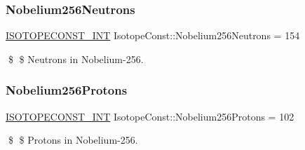 \subsubsection{\texorpdfstring{Nobelium256\+Neutrons}{Nobelium256Neutrons}}
{\footnotesize\ttfamily \mbox{\hyperlink{group___isotope_const-_macros_ga5f18360b3e99483a35c32d789e62621c}{I\+S\+O\+T\+O\+P\+E\+C\+O\+N\+S\+T\+\_\+\+I\+NT}} Isotope\+Const\+::\+Nobelium256\+Neutrons = 154}

\$ \$ Neutrons in Nobelium-\/256. \mbox{\label{group___isotope_const-_nobelium-_no256_ga01f63c7478da5d8e6c1de50a7e91f496}} 
\subsubsection{\texorpdfstring{Nobelium256\+Protons}{Nobelium256Protons}}
{\footnotesize\ttfamily \mbox{\hyperlink{group___isotope_const-_macros_ga5f18360b3e99483a35c32d789e62621c}{I\+S\+O\+T\+O\+P\+E\+C\+O\+N\+S\+T\+\_\+\+I\+NT}} Isotope\+Const\+::\+Nobelium256\+Protons = 102}

\$ \$ Protons in Nobelium-\/256. 